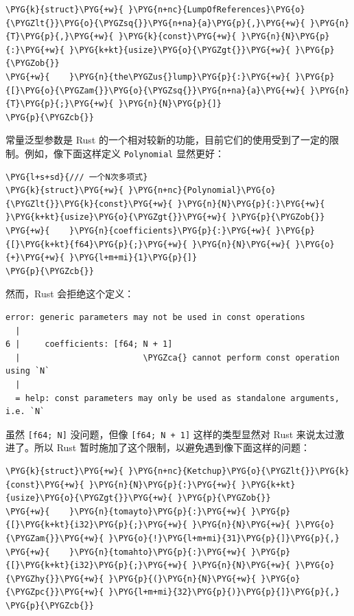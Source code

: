\begin{Verbatim}[commandchars=\\\{\},breaklines=true,breakanywhere=true,fontsize=\codefont,xleftmargin=17bp]
\PYG{k}{struct}\PYG{+w}{ }\PYG{n+nc}{LumpOfReferences}\PYG{o}{\PYGZlt{}}\PYG{o}{\PYGZsq{}}\PYG{n+na}{a}\PYG{p}{,}\PYG{+w}{ }\PYG{n}{T}\PYG{p}{,}\PYG{+w}{ }\PYG{k}{const}\PYG{+w}{ }\PYG{n}{N}\PYG{p}{:}\PYG{+w}{ }\PYG{k+kt}{usize}\PYG{o}{\PYGZgt{}}\PYG{+w}{ }\PYG{p}{\PYGZob{}}
\PYG{+w}{    }\PYG{n}{the\PYGZus{}lump}\PYG{p}{:}\PYG{+w}{ }\PYG{p}{[}\PYG{o}{\PYGZam{}}\PYG{o}{\PYGZsq{}}\PYG{n+na}{a}\PYG{+w}{ }\PYG{n}{T}\PYG{p}{;}\PYG{+w}{ }\PYG{n}{N}\PYG{p}{]}
\PYG{p}{\PYGZcb{}}
\end{Verbatim}

常量泛型参数是 Rust 的一个相对较新的功能，目前它们的使用受到了一定的限制。例如，像下面这样定义 \texttt{Polynomial} 显然更好：

\begin{Verbatim}[commandchars=\\\{\},breaklines=true,breakanywhere=true,fontsize=\codefont,xleftmargin=17bp]
\PYG{l+s+sd}{/// 一个N次多项式}
\PYG{k}{struct}\PYG{+w}{ }\PYG{n+nc}{Polynomial}\PYG{o}{\PYGZlt{}}\PYG{k}{const}\PYG{+w}{ }\PYG{n}{N}\PYG{p}{:}\PYG{+w}{ }\PYG{k+kt}{usize}\PYG{o}{\PYGZgt{}}\PYG{+w}{ }\PYG{p}{\PYGZob{}}
\PYG{+w}{    }\PYG{n}{coefficients}\PYG{p}{:}\PYG{+w}{ }\PYG{p}{[}\PYG{k+kt}{f64}\PYG{p}{;}\PYG{+w}{ }\PYG{n}{N}\PYG{+w}{ }\PYG{o}{+}\PYG{+w}{ }\PYG{l+m+mi}{1}\PYG{p}{]}
\PYG{p}{\PYGZcb{}}
\end{Verbatim}

然而，Rust 会拒绝这个定义：

\begin{Verbatim}[commandchars=\\\{\},breaklines=true,breakanywhere=true,fontsize=\codefont,xleftmargin=17bp]
error: generic parameters may not be used in const operations
  |
6 |     coefficients: [f64; N + 1]
  |                         \PYGZca{} cannot perform const operation using `N`
  |
  = help: const parameters may only be used as standalone arguments, i.e. `N`
\end{Verbatim}

虽然 \texttt{[f64; N]} 没问题，但像 \texttt{[f64; N + 1]} 这样的类型显然对 Rust 来说太过激进了。所以 Rust 暂时施加了这个限制，以避免遇到像下面这样的问题：

\begin{Verbatim}[commandchars=\\\{\},breaklines=true,breakanywhere=true,fontsize=\codefont,xleftmargin=17bp]
\PYG{k}{struct}\PYG{+w}{ }\PYG{n+nc}{Ketchup}\PYG{o}{\PYGZlt{}}\PYG{k}{const}\PYG{+w}{ }\PYG{n}{N}\PYG{p}{:}\PYG{+w}{ }\PYG{k+kt}{usize}\PYG{o}{\PYGZgt{}}\PYG{+w}{ }\PYG{p}{\PYGZob{}}
\PYG{+w}{    }\PYG{n}{tomayto}\PYG{p}{:}\PYG{+w}{ }\PYG{p}{[}\PYG{k+kt}{i32}\PYG{p}{;}\PYG{+w}{ }\PYG{n}{N}\PYG{+w}{ }\PYG{o}{\PYGZam{}}\PYG{+w}{ }\PYG{o}{!}\PYG{l+m+mi}{31}\PYG{p}{]}\PYG{p}{,}
\PYG{+w}{    }\PYG{n}{tomahto}\PYG{p}{:}\PYG{+w}{ }\PYG{p}{[}\PYG{k+kt}{i32}\PYG{p}{;}\PYG{+w}{ }\PYG{n}{N}\PYG{+w}{ }\PYG{o}{\PYGZhy{}}\PYG{+w}{ }\PYG{p}{(}\PYG{n}{N}\PYG{+w}{ }\PYG{o}{\PYGZpc{}}\PYG{+w}{ }\PYG{l+m+mi}{32}\PYG{p}{)}\PYG{p}{]}\PYG{p}{,}
\PYG{p}{\PYGZcb{}}
\end{Verbatim}

